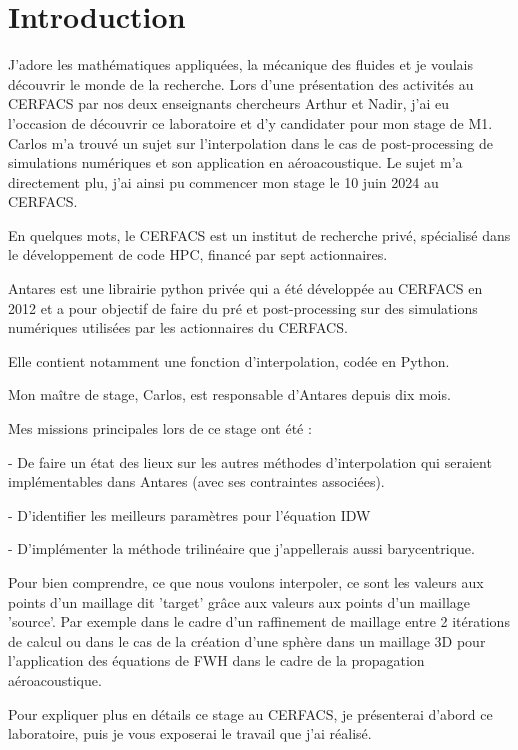 \section*{Introduction}

J'adore les mathématiques appliquées, la mécanique des fluides et je voulais découvrir le monde de la recherche. Lors d'une présentation des activités au
\ac{CERFACS} par nos deux enseignants chercheurs Arthur et Nadir, j'ai eu l'occasion de découvrir ce laboratoire et d'y candidater pour mon stage de M1. Carlos m'a trouvé un sujet sur l'interpolation dans le cas de post-processing de simulations numériques et son application en aéroacoustique. Le sujet m'a directement plu, j'ai ainsi pu commencer mon stage le 10 juin 2024 au CERFACS.

En quelques mots, le CERFACS est un institut de recherche privé, spécialisé dans le développement de code \ac{HPC}, financé par sept actionnaires.

Antares\cite{antares} est une librairie python privée qui a été développée au CERFACS en 2012 et a pour objectif de faire du pré et post-processing sur des simulations numériques utilisées par les actionnaires du CERFACS.

Elle contient notamment une fonction d'interpolation, codée en Python.

Mon maître de stage, Carlos, est responsable d'Antares depuis dix mois. 

Mes missions principales lors de ce stage ont été :

- De faire un état des lieux sur les autres méthodes d'interpolation qui seraient 
implémentables dans Antares (avec ses contraintes associées).

- D'identifier les meilleurs paramètres pour l'équation \ac{IDW} %

- D'implémenter la méthode trilinéaire que j'appellerais aussi barycentrique.

Pour bien comprendre, ce que nous voulons interpoler, ce sont les valeurs aux points d'un maillage dit 'target' grâce aux valeurs aux points d'un maillage 'source'. Par exemple dans le cadre d'un raffinement de maillage entre 2 itérations de calcul ou dans le cas de la création d'une sphère dans un maillage 3D pour l'application des équations de \ac{FWH} dans le cadre de la propagation aéroacoustique.

Pour expliquer plus en détails ce stage au CERFACS, je présenterai d'abord ce laboratoire, puis je vous exposerai le travail que j'ai réalisé.

% 